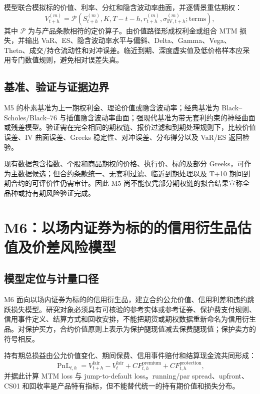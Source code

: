 模型联合模拟标的价值、利率、分红和隐含波动率曲面，并逐情景重估期权：
\begin{equation}
  V_{t+h}^{(m)}
  =\mathcal{P}\!\left(S_{t+h}^{(m)},K,T-t-h,
  r_{t+h}^{(m)},\sigma_{\mathrm{IV},t+h}^{(m)};\text{terms}\right),
\end{equation}
其中 \(\mathcal{P}\) 为与产品条款相符的定价算子。由价值路径形成权利金或组合 MTM 损失，并输出 VaR、ES、隐含波动率水平与偏斜、Delta、Gamma、Vega、Theta、成交/持仓流动性和对冲误差。临近到期、深度虚实值及低价格样本应采用专门数值规则，避免相对误差失真。

\subsection{基准、验证与证据边界}

M5 的朴素基准为上一期权利金、理论价值或隐含波动率；经典基准为 Black--Scholes/Black--76 与插值隐含波动率曲面；强现代基准为带无套利约束的神经曲面或残差模型。验证需在完全相同的期权链、报价过滤和到期处理规则下，比较价值误差、IV 曲面误差、Greeks 稳定性、对冲误差、分布得分以及 VaR/ES 返回检验。

现有数据包含指数、个股和商品期权的价格、执行价、标的及部分 Greeks，可作为主数据候选；但合约条款统一、无套利过滤、临近到期处理以及 T+10 期间到期合约的可评价性仍需审计。因此 M5 尚不能仅凭部分期权链的拟合结果宣称全品种或持有期风险验证完成。

\section{M6：以场内证券为标的的信用衍生品估值及价差风险模型}
\label{sec:m6-credit-derivative}

\subsection{模型定位与计量口径}

M6 面向以场内证券为标的的信用衍生品，建立合约公允价值、信用利差和违约跳跃损失模型。研究对象必须具有可核验的参考实体或参考证券、保护费支付规则、信用事件定义、结算方式和回收安排，不能把期货或期权数据重新命名为信用衍生品。对保护买方，合约价值原则上表示为保护腿现值减去保费腿现值；保护卖方的符号相反。

持有期总损益由公允价值变化、期间保费、信用事件赔付和结算现金流共同形成：
\begin{equation}
  \operatorname{PnL}_{t,h}
  =V_{t+h}^{\mathrm{fair}}-V_t^{\mathrm{fair}}
  +CF_{t,h}^{\mathrm{premium}}
  +CF_{t,h}^{\mathrm{protection}},
\end{equation}
并据此计算 MTM loss 与 jump-to-default loss。running/par spread、upfront、CS01 和回收率是产品特有指标，但不能替代统一的持有期价值和损失分布。


